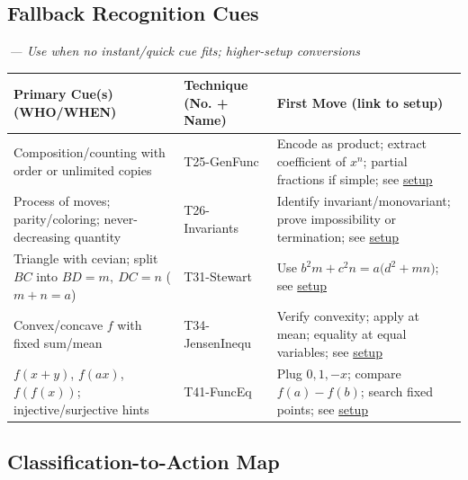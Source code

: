\documentclass{article}
\begin{document}
\subsection{Fallback Recognition Cues}
{\footnotesize\textcolor{timegreen}{}}\,\textit{— Use when no instant/quick cue fits; higher-setup conversions}\\
\begin{center}
\begin{longtable}{|>{\raggedright\arraybackslash}m{}|>{\raggedright\arraybackslash}p{}|>{\raggedright\arraybackslash}p{}|}
\hline
\textbf{Primary Cue(s) (WHO/WHEN)} & \textbf{Technique (No. + Name)} & \textbf{First Move (link to setup)} \\
\hline
Composition/counting with order or unlimited copies & T25-GenFunc & Encode as product; extract coefficient of $x^n$; partial fractions if simple; see \hyperlink{technique-setup}{setup} \\
\hline
Process of moves; parity/coloring; never-decreasing quantity & T26-Invariants & Identify invariant/monovariant; prove impossibility or termination; see \hyperlink{technique-setup}{setup} \\
\hline
Triangle with cevian; split $BC$ into $BD=m,\ DC=n$ ($m{+}n=a$) & T31-Stewart & Use $b^2 m + c^2 n = a\big(d^2 + mn\big)$; see \hyperlink{technique-setup}{setup} \\
\hline
Convex/concave $f$ with fixed sum/mean & T34-JensenInequ & Verify convexity; apply at mean; equality at equal variables; see \hyperlink{technique-setup}{setup} \\
\hline
$f(x+y)$, $f(ax)$, $f(f(x))$; injective/surjective hints & T41-FuncEq & Plug $0,1,-x$; compare $f(a)-f(b)$; search fixed points; see \hyperlink{technique-setup}{setup} \\
\hline
\end{longtable}
\end{center}

\iffalse
\subsection{Classification-to-Action Map}
{\footnotesize\textcolor{timegreen}{}}\\
\end{document}
